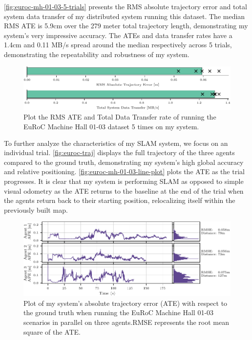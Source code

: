 
\autoref{fig:euroc-mh-01-03-5-trials} presents the RMS absolute trajectory error and total system data transfer of my distributed system running this dataset. The median RMS ATE is 5.9cm over the 279 meter total trajectory length, demonstrating my system's very impressive accuracy. The ATEs and data transfer rates have a 1.4cm and 0.11 MB/s spread around the median respectively across 5 trials, demonstrating the repeatability and robustness of my system.

\begin{figure}[h]
    \centering
    \includegraphics[width=0.8\linewidth]{figures/comparison_apr11_mh_trajectory_b.pdf}

    \caption{Plot the RMS ATE and Total Data Transfer rate of running the EuRoC Machine Hall 01-03 dataset 5 times on my system.}
    \label{fig:euroc-mh-01-03-5-trials}
\end{figure}

To further analyze the characteristics of my SLAM system, we focus on an individual trial. \autoref{fig:euroc-traj} displays the full trajectory of the three agents compared to the ground truth, demonstrating my system's high global accuracy and relative positioning. \autoref{fig:euroc-mh-01-03-line-plot} plots the ATE as the trial progresses. It is clear that my system is performing SLAM as opposed to simple visual odometry as the ATE returns to the baseline at the end of the trial when the agents return back to their starting position, relocalizing itself within the previously built map.

\begin{figure}[h]
    \centering
    \includegraphics[width=0.9\linewidth]{figures/EuRoC_MH_01-03_line_plot.pdf}

    \caption{Plot of my system's absolute trajectory error (ATE) with respect to the ground truth when running the EuRoC Machine Hall 01-03 scenarios in parallel on three agents.\captionbreak RMSE represents the root mean square of the ATE.}
    \label{fig:euroc-mh-01-03-line-plot}
\end{figure}

